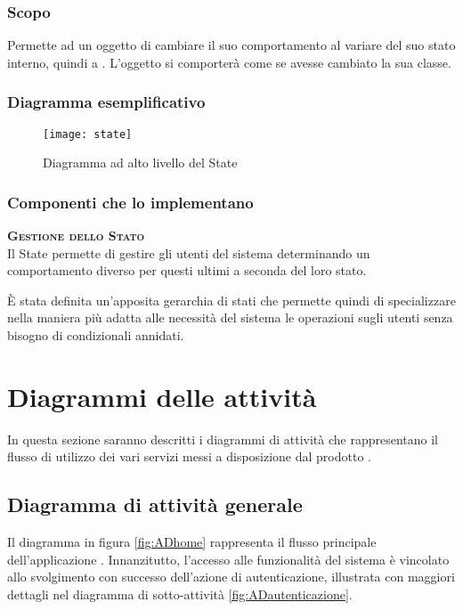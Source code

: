 \subsubsection{Scopo}
Permette ad un oggetto di cambiare il suo comportamento al variare del suo stato interno, quindi a . L'oggetto si comporterà come se avesse cambiato la sua classe.

\subsubsection{Diagramma esemplificativo}
\begin{figure}[H]
\centering
\texttt{[image: state]}
\caption{Diagramma ad alto livello del  State}\label{fig:state}
\end{figure}

\subsubsection{Componenti che lo implementano}
\begin{description}
\item{\scshape\bfseries Gestione dello Stato}\\
Il  State permette di gestire gli utenti del sistema determinando un comportamento diverso per questi ultimi a seconda del loro stato.

È stata definita un'apposita gerarchia di stati che permette quindi di specializzare nella maniera più adatta alle necessità del sistema le operazioni sugli utenti senza bisogno di condizionali annidati.
\end{description}
\clearpage

\section{Diagrammi delle attività}
In questa sezione saranno descritti i diagrammi di attività che rappresentano il flusso di utilizzo dei vari servizi messi a disposizione dal prodotto \caName.

\subsection{Diagramma di attività generale}

Il diagramma in figura \vref{fig:ADhome} rappresenta il flusso principale dell'applicazione \caName. Innanzitutto, l'accesso alle funzionalità del sistema è vincolato allo svolgimento con successo dell'azione di autenticazione, illustrata con maggiori dettagli nel diagramma di sotto-attività \vref{fig:ADautenticazione}.

